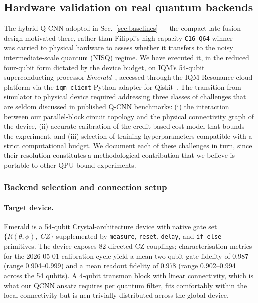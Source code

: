 \subsection{Hardware validation on real quantum backends}
\label{sec:hw_validation}

The hybrid Q-CNN adopted in Sec.~\ref{sec:baselines} --- the compact late-fusion design motivated there, rather than Filippi's high-capacity \texttt{C16--Q64} winner --- was carried to physical hardware to assess whether it transfers to the noisy intermediate-scale quantum (NISQ) regime. We have executed it, in the reduced four-qubit form dictated by the device budget, on IQM's 54-qubit superconducting processor \emph{Emerald}~\cite{IQMResonance2025}, accessed through the IQM Resonance cloud platform via the \texttt{iqm-client} Python adapter for Qiskit~\cite{IQMClientDocs2025,QiskitOnIQMGuide}. The transition from simulator to physical device required addressing three classes of challenges that are seldom discussed in published Q-CNN benchmarks: (i) the interaction between our parallel-block circuit topology and the physical connectivity graph of the device, (ii) accurate calibration of the credit-based cost model that bounds the experiment, and (iii) selection of training hyperparameters compatible with a strict computational budget. We document each of these challenges in turn, since their resolution constitutes a methodological contribution that we believe is portable to other QPU-bound experiments.

\subsubsection{Backend selection and connection setup}
\label{subsec:backend_setup}

\paragraph{Target device.} 
Emerald is a 54-qubit Crystal-architecture device with native gate set $\{R(\theta,\phi),\; CZ\}$ supplemented by \texttt{measure}, \texttt{reset}, \texttt{delay}, and \texttt{if\_else} primitives. The device exposes 82 directed CZ couplings; characterisation metrics for the 2026-05-01 calibration cycle yield a mean two-qubit gate fidelity of 0.987 (range 0.904--0.999) and a mean readout fidelity of 0.978 (range 0.902--0.994 across the 54 qubits). A 4-qubit transmon block with linear connectivity, which is what our QCNN ansatz requires per quantum filter, fits comfortably within the local connectivity but is non-trivially distributed across the global device.


